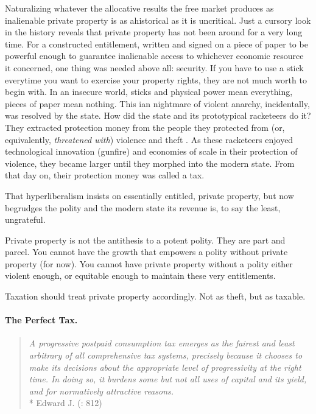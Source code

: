 Naturalizing whatever the allocative results the free market produces as inalienable private property is as ahistorical as it is uncritical. Just a cursory look in the history reveals that  private property has not been around for a very long time. For a constructed entitlement, written and signed on a piece of paper to be powerful enough to guarantee inalienable access to whichever economic resource it concerned, one thing was needed above all: security. If you have to use a stick everytime you want to exercise your property rights, they are not much worth to begin with. In an insecure world, sticks and physical power mean everything, pieces of paper mean nothing. This \citeauthor{Hobbes-1651-aa}ian nightmare of violent anarchy, incidentally, was resolved by the state. How did the state and its prototypical racketeers do it? They extracted protection money from the people they protected from (or, equivalently, \emph{threatened with}) violence and theft \citep{Tilly-1985-aa}. As these racketeers enjoyed technological innovation (gunfire) and economies of scale in their protection of violence, they became larger until they morphed into the modern state. From that day on, their protection money was called a tax.

That hyperliberalism insists on essentially entitled, private property, but now begrudges the polity and the modern state its revenue is, to say the least, ungrateful.

Private property is not the antithesis to a potent polity. They are part and parcel. You cannot have the growth that empowers a polity without private property (for now). You cannot have private property without a polity either violent enough, or equitable enough to maintain these very entitlements. 

Taxation should treat private property accordingly. Not as theft, but as taxable.

\paragraph{The Perfect Tax.}

\begin{quote}
	\emph{A progressive postpaid consumption tax emerges as the fairest and least arbitrary of all comprehensive tax systems, precisely because it chooses to make its decisions about the appropriate level of progressivity at the right time. In doing so, it burdens some but not all uses of capital and its yield, and for normatively attractive reasons.}\\*
	Edward J. \citeauthor{McCaffery2005} (\citeyear{McCaffery2005}: 812)
\end{quote}

